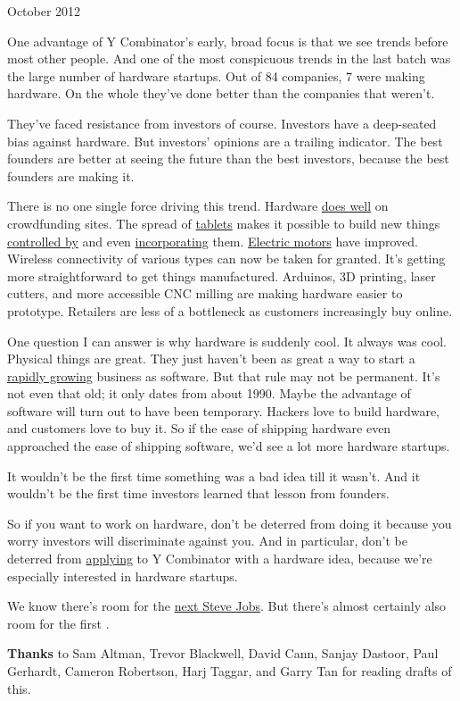 October 2012

One advantage of Y Combinator's early, broad focus is that we see trends
before most other people. And one of the most conspicuous trends in the
last batch was the large number of hardware startups. Out of 84
companies, 7 were making hardware. On the whole they've done better than
the companies that weren't.

They've faced resistance from investors of course. Investors have a
deep-seated bias against hardware. But investors' opinions are a
trailing indicator. The best founders are better at seeing the future
than the best investors, because the best founders are making it.

There is no one single force driving this trend. Hardware
\href{http://bits.blogs.nytimes.com/2012/05/11/pebble-smartwatch-tops-out-at-10-million-on-kickstarter/}{does
well} on crowdfunding sites. The spread of
\href{http://paulgraham.com/tablets.html}{tablets} makes it possible to
build new things \href{http://lockitron.com}{controlled by} and even
\href{http://doublerobotics.com}{incorporating} them.
\href{http://www.boostedboards.com/}{Electric motors} have improved.
Wireless connectivity of various types can now be taken for granted.
It's getting more straightforward to get things manufactured. Arduinos,
3D printing, laser cutters, and more accessible CNC milling are making
hardware easier to prototype. Retailers are less of a bottleneck as
customers increasingly buy online.

One question I can answer is why hardware is suddenly cool. It always
was cool. Physical things are great. They just haven't been as great a
way to start a \href{growth.html}{rapidly growing} business as software.
But that rule may not be permanent. It's not even that old; it only
dates from about 1990. Maybe the advantage of software will turn out to
have been temporary. Hackers love to build hardware, and customers love
to buy it. So if the ease of shipping hardware even approached the ease
of shipping software, we'd see a lot more hardware startups.

It wouldn't be the first time something was a bad idea till it wasn't.
And it wouldn't be the first time investors learned that lesson from
founders.

So if you want to work on hardware, don't be deterred from doing it
because you worry investors will discriminate against you. And in
particular, don't be deterred from
\href{http://ycombinator.com/apply.html}{applying} to Y Combinator with
a hardware idea, because we're especially interested in hardware
startups.

We know there's room for the \href{ambitious.html}{next Steve Jobs}. But
there's almost certainly also room for the first .

\textbf{Thanks} to Sam Altman, Trevor Blackwell, David Cann, Sanjay
Dastoor, Paul Gerhardt, Cameron Robertson, Harj Taggar, and Garry Tan
for reading drafts of this.

